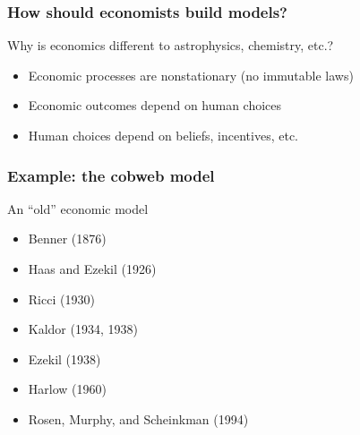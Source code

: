 \documentclass[
    xcolor={svgnames,dvipsnames},
    hyperref={colorlinks, citecolor=DeepPink4, linkcolor=DarkRed, urlcolor=DarkBlue}
    ]{beamer}  %
\newcommand{\Eg}{\textcolor{ForestGreen}{Example. }}
\newcommand{\1}{\mathbbm 1}
\begin{document}
\begin{frame}
    \frametitle{How should economists build models?}

    Why is economics different to astrophysics, chemistry, etc.?
            \vspace{0.3em}
            \vspace{0.3em}

    \begin{itemize}
        \item Economic processes are nonstationary (no immutable laws)
            \vspace{0.3em}
            \vspace{0.3em}
        \item Economic outcomes depend on human choices
            \vspace{0.3em}
            \vspace{0.3em}
        \item Human choices depend on beliefs, incentives, etc.
    \end{itemize}



\end{frame}

\begin{frame}
    \frametitle{Example: the cobweb model}

    An ``old'' economic model

    \begin{itemize}
        \item Benner (1876)
        \item Haas and Ezekil (1926)
        \item Ricci (1930)
        \item Kaldor (1934, 1938)
        \item Ezekil (1938)
        \item Harlow (1960)
        \item Rosen, Murphy, and Scheinkman (1994)
    \end{itemize}

\end{frame}
\end{document}
